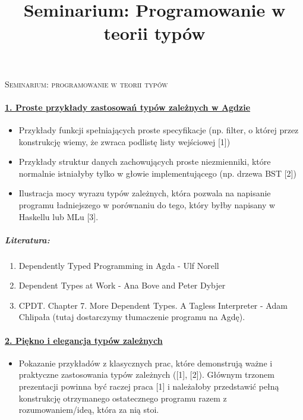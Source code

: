 \documentclass[10pt, a4paper]{article}
\author{}
\title{Seminarium: Programowanie w teorii typów}
\begin{document}
\begin{center}
\begin{Large}
\textsc{Seminarium: programowanie w teorii typów}
\end{Large}
\end{center}

\paragraph{\underline{1. Proste przykłady zastosowań typów zależnych w Agdzie}}

\begin{itemize}
\addtolength{\itemsep}{-0.5\baselineskip}
\item
    Przykłady funkcji spełniających proste specyfikacje (np. filter, o której przez konstrukcję wiemy, że zwraca podlistę listy wejściowej [1])
\item
    Przykłady struktur danych zachowujących proste niezmienniki, które normalnie istniałyby tylko w głowie implementującego (np. drzewa BST [2])
\item
    Ilustracja mocy wyrazu typów zależnych, która pozwala na napisanie programu ładniejszego w porównaniu do tego, który byłby napisany w Haskellu lub MLu [3].

\end{itemize}

\subparagraph{Literatura:}

\begin{enumerate}
\addtolength{\itemsep}{-0.5\baselineskip}
 \item  Dependently Typed Programming in Agda - Ulf Norell
 \item  Dependent Types at Work - Ana Bove and Peter Dybjer
 \item  CPDT. Chapter 7. More Dependent Types. A Tagless Interpreter - Adam Chlipała (tutaj dostarczymy tłumaczenie programu na Agdę).
\end{enumerate}

\paragraph{\underline{2. Piękno i elegancja typów zależnych}}

\begin{itemize}
 \item 
Pokazanie przykładów z klasycznych prac, które demonstrują ważne i praktyczne zastosowania typów zależnych ([1], [2]). Głównym trzonem prezentacji powinna być raczej praca [1] i należałoby przedstawić pełną konstrukcję otrzymanego ostatecznego programu razem z rozumowaniem/ideą, która za nią stoi.
\end{itemize}
\end{document}
